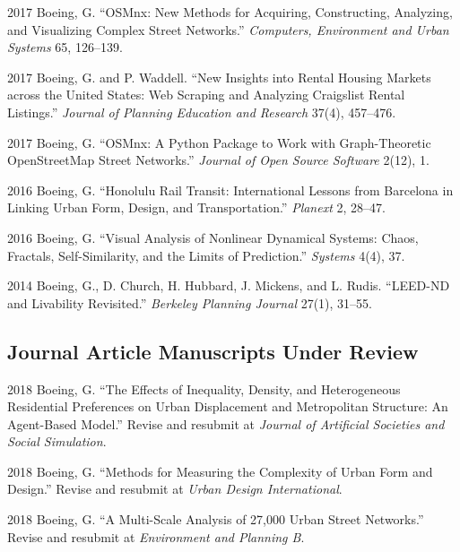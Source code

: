 \documentclass{academiccv}
\begin{document}
\begin{tablist}

\item[2017] \tab Boeing, G. \enquote{OSMnx: New Methods for Acquiring, Constructing, Analyzing, and Visualizing Complex Street Networks.} \emph{Computers, Environment and Urban Systems} 65, 126--139.

\item[2017] \tab Boeing, G. and P. Waddell. \enquote{New Insights into Rental Housing Markets across the United States: Web Scraping and Analyzing Craigslist Rental Listings.} \emph{Journal of Planning Education and Research} 37(4), 457--476.

\item[2017] \tab Boeing, G. \enquote{OSMnx: A Python Package to Work with Graph-Theoretic OpenStreetMap Street Networks.} \emph{Journal of Open Source Software} 2(12), 1.

\item[2016] \tab Boeing, G. \enquote{Honolulu Rail Transit: International Lessons from Barcelona in Linking Urban Form, Design, and Transportation.} \emph{Planext} 2, 28--47.

\item[2016] \tab Boeing, G. \enquote{Visual Analysis of Nonlinear Dynamical Systems: Chaos, Fractals, Self-Similarity, and the Limits of Prediction.} \emph{Systems} 4(4), 37.

\item[2014] \tab Boeing, G., D. Church, H. Hubbard, J. Mickens, and L. Rudis. \enquote{LEED-ND and Livability Revisited.} \emph{Berkeley Planning Journal} 27(1), 31--55.

\end{tablist}



\subsection*{Journal Article Manuscripts Under Review}

\begin{tablist}

\item[2018] \tab Boeing, G. \enquote{The Effects of Inequality, Density, and Heterogeneous Residential Preferences on Urban Displacement and Metropolitan Structure: An Agent-Based Model.} Revise and resubmit at \emph{Journal of Artificial Societies and Social Simulation}.

\item[2018] \tab Boeing, G. \enquote{Methods for Measuring the Complexity of Urban Form and Design.} Revise and resubmit at \emph{Urban Design International}.

\item[2018] \tab Boeing, G. \enquote{A Multi-Scale Analysis of 27,000 Urban Street Networks.} Revise and resubmit at \emph{Environment and Planning B}.

\end{tablist}
\end{document}
